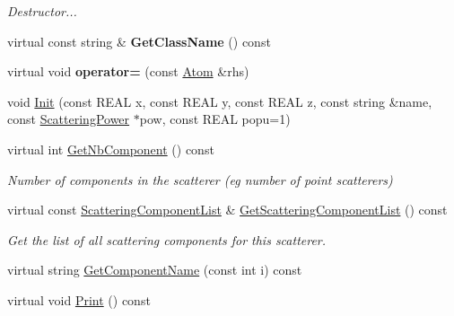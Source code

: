 \begin{DoxyCompactItemize}
\begin{DoxyCompactList}\small\item\em Destructor... \end{DoxyCompactList}\item 
\mbox{\label{class_obj_cryst_1_1_atom_abe8065c3ee0e20a38063650045ff1814}} 
virtual const string \& {\bfseries Get\+Class\+Name} () const
\item 
\mbox{\label{class_obj_cryst_1_1_atom_a4befd1307ea225071938f35cfae808a9}} 
virtual void {\bfseries operator=} (const \mbox{\hyperlink{class_obj_cryst_1_1_atom}{Atom}} \&rhs)
\item 
void \mbox{\hyperlink{class_obj_cryst_1_1_atom_ab05ef76113333041255789dba4bb60cd}{Init}} (const R\+E\+AL x, const R\+E\+AL y, const R\+E\+AL z, const string \&name, const \mbox{\hyperlink{class_obj_cryst_1_1_scattering_power}{Scattering\+Power}} $\ast$pow, const R\+E\+AL popu=1)
\item 
\mbox{\label{class_obj_cryst_1_1_atom_a9ffe360231181b611dd388b28a68e4bb}} 
virtual int \mbox{\hyperlink{class_obj_cryst_1_1_atom_a9ffe360231181b611dd388b28a68e4bb}{Get\+Nb\+Component}} () const
\begin{DoxyCompactList}\small\item\em Number of components in the scatterer (eg number of point scatterers) \end{DoxyCompactList}\item 
virtual const \mbox{\hyperlink{class_obj_cryst_1_1_scattering_component_list}{Scattering\+Component\+List}} \& \mbox{\hyperlink{class_obj_cryst_1_1_atom_a91b7898458e7d14431ceaa380b8a2121}{Get\+Scattering\+Component\+List}} () const
\begin{DoxyCompactList}\small\item\em Get the list of all scattering components for this scatterer. \end{DoxyCompactList}\item 
virtual string \mbox{\hyperlink{class_obj_cryst_1_1_atom_ab6a32c77f67ab2682e00cef7969a59fd}{Get\+Component\+Name}} (const int i) const
\item 
\mbox{\label{class_obj_cryst_1_1_atom_a8cf5b61d0df0bf2e55d6c44f67c06da0}} 
virtual void \mbox{\hyperlink{class_obj_cryst_1_1_atom_a8cf5b61d0df0bf2e55d6c44f67c06da0}{Print}} () const

\end{DoxyCompactItemize}
